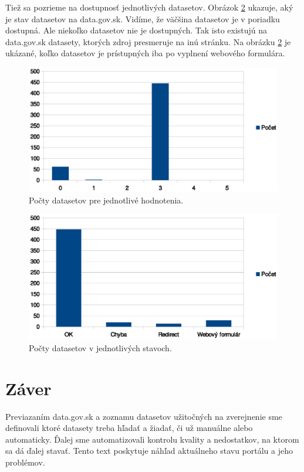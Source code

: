 \documentclass[12pt,a4paper]{article}
\begin{document}
Tiež sa pozrieme na dostupnosť jednotlivých datasetov. Obrázok \ref{status} ukazuje, aký je stav datasetov na data.gov.sk. Vidíme, že väčšina datasetov je v poriadku dostupná. Ale niekoľko datasetov nie je dostupných. Tak isto existujú na data.gov.sk datasety, ktorých zdroj presmeruje na inú stránku. Na obrázku \ref{status} je ukázané, koľko datasetov je prístupných iba po vyplnení webového formulára.

\begin{figure}
\center \includegraphics[width=14cm]{stars}
\caption{Počty datasetov pre jednotlivé hodnotenia.}
\label{stars}
\end{figure}

\begin{figure}
\center \includegraphics[width=14cm]{status}
\caption{Počty datasetov v jednotlivých stavoch.}
\label{status}
\end{figure}

\section{Záver} 

Previazaním data.gov.sk a zoznamu datasetov užitočných na zverejnenie sme definovali ktoré datasety treba hľadať a žiadať, či už manuálne alebo automaticky. Ďalej sme automatizovali kontrolu kvality a nedostatkov, na ktorom sa dá ďalej stavať. Tento text poskytuje náhľad aktuálneho stavu portálu a jeho problémov. 
\end{document}
